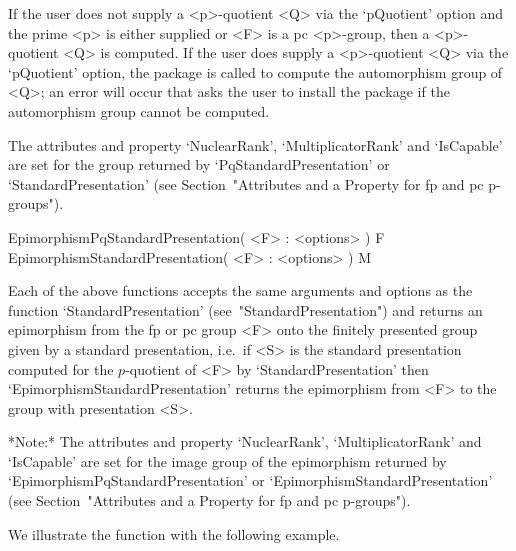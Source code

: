 If the user does not supply a <p>-quotient <Q> via the `pQuotient' option
and the prime <p> is either supplied or <F> is a  pc  <p>-group,  then  a
<p>-quotient <Q> is computed. If the user does supply a <p>-quotient  <Q>
via the `pQuotient' option, the package {\AutPGrp} is called  to  compute
the automorphism group of <Q>; an error will occur that asks the user  to
install the package  {\AutPGrp}  if  the  automorphism  group  cannot  be
computed.

The  attributes  and  property  `NuclearRank',  `MultiplicatorRank'   and
`IsCapable' are set for the group returned by `PqStandardPresentation' or
`StandardPresentation' (see Section~"Attributes and a Property for fp and
pc p-groups").

\>EpimorphismPqStandardPresentation( <F> : <options> ) F
\>EpimorphismStandardPresentation( <F> : <options> ) M

Each of the above functions accepts the same arguments and options as the
function `StandardPresentation' (see~"StandardPresentation") and  returns
an epimorphism from the fp or pc group <F> onto  the  finitely  presented
group given by a standard  presentation,  i.e.~if  <S>  is  the  standard
presentation    computed    for    the    $p$-quotient    of    <F>    by
`StandardPresentation' then `EpimorphismStandardPresentation' returns the
epimorphism from <F> to the group with presentation <S>.

*Note:*
The  attributes  and  property  `NuclearRank',  `MultiplicatorRank'   and
`IsCapable' are set for the image group of the  epimorphism  returned  by
`EpimorphismPqStandardPresentation' or  `EpimorphismStandardPresentation'
(see Section~"Attributes and a Property for fp and pc p-groups").

We illustrate the function with the following example.


